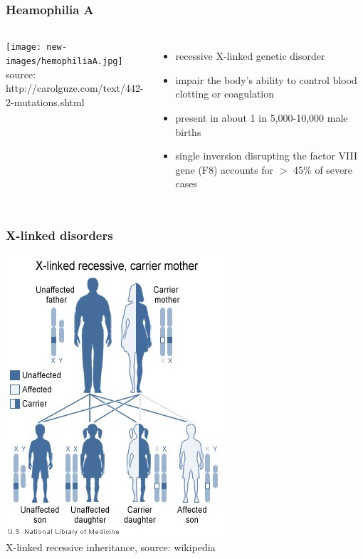 \begin{frame}\frametitle{Heamophilia A}

 \begin{columns}
	    \begin{center}
	   \texttt{[image: new-images/hemophiliaA.jpg]}\\
	   \tiny{source: http://carolguze.com/text/442-2-mutations.shtml}  
	    \end{center}
\begin{itemize}
 \item recessive X-linked genetic disorder
 \item impair the body's ability to control blood clotting or coagulation %
 \item present in about 1 in 5,000-10,000 male births
\item single inversion disrupting the factor VIII gene (F8) accounts for $>$ 45\% of severe cases
 
\end{itemize}
\end{columns}
\end{frame}

\begin{frame}\frametitle{X-linked disorders}
	    \begin{center}
	   \includegraphics[width=0.5 \textwidth]{new-images/XlinkRecessive.jpg}\\
	   \tiny{X-linked recessive inheritance, source: wikipedia}  
	    \end{center}
\end{frame}



